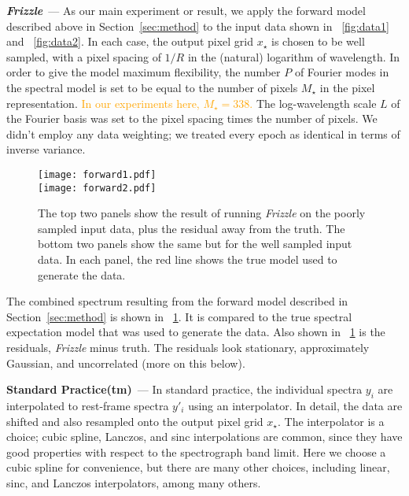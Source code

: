 \documentclass[modern, linenumbers]{aastex631}
\renewcommand{\paragraph}[1]{\medskip\par\noindent\textbf{#1}~---}
\newlength{\figurewidth}
\newcommand{\sectionname}{Section}
\newcommand{\secref}[1]{\sectionname~\ref{#1}}
\newcommand{\name}{\textsl{Frizzle}}
\newcommand{\modified}[1]{\textcolor{orange}{#1}}
\begin{document}
\paragraph{\name{}}
As our main experiment or result, we apply the forward model described above in \secref{sec:method} to the input data shown in \figurename~\ref{fig:data1} and \figurename~\ref{fig:data2}.
In each case, the output pixel grid $x_\star$ is chosen to be well sampled, with a pixel spacing of $1/R$ in the (natural) logarithm of wavelength.
In order to give the model maximum flexibility, the number $P$ of Fourier modes in the spectral model is set to be equal to the number of pixels $M_\star$ in the pixel representation. \modified{In our experiments here, $M_\star = 338$. }
The log-wavelength scale $L$ of the Fourier basis was set to the pixel spacing times the number of pixels.
We didn't employ any data weighting; we treated every epoch as identical in terms of inverse variance.

\begin{figure}[t!]
    \begin{mdframed}\begin{center}
    \texttt{[image: forward1.pdf]}\\
    \texttt{[image: forward2.pdf]}
    \end{center}
    \caption{The top two panels show the result of running \name{} on the poorly sampled input data, plus the residual away from the truth. The bottom two panels show the same but for the well sampled input data. In each panel, the red line shows the true model used to generate the data.\label{fig:forward}}
    \end{mdframed}
\end{figure}
The combined spectrum resulting from the forward model described in \secref{sec:method} is shown in \figurename~\ref{fig:forward}.
It is compared to the true spectral expectation model that was used to generate the data.
Also shown in \figurename~\ref{fig:forward} is the residuals, \name{} minus truth.
The residuals look stationary, approximately Gaussian, and uncorrelated (more on this below).

\paragraph{Standard Practice(tm)}
In standard practice, the individual spectra $y_i$ are interpolated to rest-frame spectra $y'_i$ using an interpolator.
In detail, the data are shifted and also resampled onto the output pixel grid $x_\star$.
The interpolator is a choice; cubic spline, Lanczos, and sinc interpolations are common, since they have good properties with respect to the spectrograph band limit.
Here we choose a cubic spline for convenience, but there are many other choices, including linear, sinc, and Lanczos interpolators, among many others.
\end{document}
